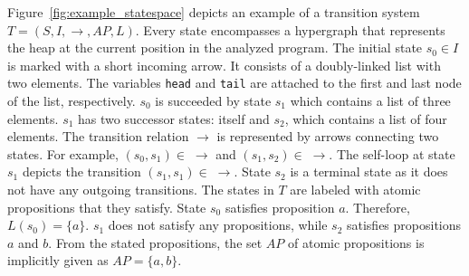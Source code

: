 \documentclass[a4paper, 12pt, twoside]{report}
\begin{document}
	Figure~\ref{fig:example_statespace} depicts an example of a transition system $T=(S, I, \rightarrow, AP, L)$. Every state encompasses a hypergraph that represents the heap at the current position in the analyzed program. The initial state $s_0 \in I$ is marked with a short incoming arrow. It consists of a doubly-linked list with two elements. The variables \texttt{head} and \texttt{tail} are attached to the first and last node of the list, respectively. $s_0$ is succeeded by state $s_1$ which contains a list of three elements. $s_1$ has two successor states: itself and $s_2$, which contains a list of four elements. The transition relation $\rightarrow$ is represented by arrows connecting two states. For example, $(s_0, s_1) \in\; \rightarrow$ and $(s_1, s_2) \in\; \rightarrow$. The self-loop at state $s_1$ depicts the transition $(s_1,s_1) \in\; \rightarrow$. State $s_2$ is a terminal state as it does not have any outgoing transitions. The states in $T$ are labeled with atomic propositions that they satisfy. State $s_0$ satisfies proposition $a$. Therefore, $L(s_0)=\{a\}$. $s_1$ does not satisfy any propositions, while $s_2$ satisfies propositions $a$ and $b$. From the stated propositions, the set $AP$ of atomic propositions is implicitly given as $AP=\{a,b\}$.\\
	
\end{document}

